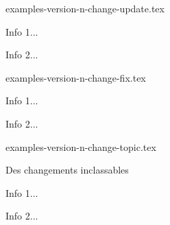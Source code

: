 \begin{filecontents*}[overwrite]{examples-version-n-change-update.tex}
\begin{tdocupdate}
    \item Info 1...
    \item Info 2...
\end{tdocupdate}
\end{filecontents*}


\begin{filecontents*}[overwrite]{examples-version-n-change-fix.tex}
\begin{tdocfix}
    \item Info 1...
    \item Info 2...
\end{tdocfix}
\end{filecontents*}


\begin{filecontents*}[overwrite]{examples-version-n-change-topic.tex}
\begin{tdoctopic}{Des changements inclassables}
    \item Info 1...
    \item Info 2...
\end{tdoctopic}
\end{filecontents*}



\documentclass[10pt, a4paper]{article}

\usepackage[utf8]{inputenc}
\usepackage[T1]{fontenc}

\usepackage[french]{babel, varioref}

\usepackage{enumitem}

\usepackage[lang = french]{tutodoc}







